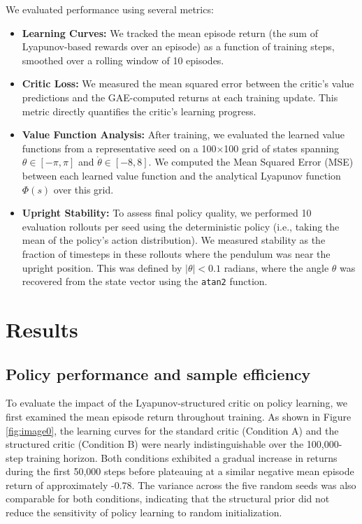 \documentclass[]{article}
\begin{document}
We evaluated performance using several metrics:
\begin{itemize}
    \item \textbf{Learning Curves:} We tracked the mean episode return (the sum of Lyapunov-based rewards over an episode) as a function of training steps, smoothed over a rolling window of 10 episodes.
    \item \textbf{Critic Loss:} We measured the mean squared error between the critic's value predictions and the GAE-computed returns at each training update. This metric directly quantifies the critic's learning progress.
    \item \textbf{Value Function Analysis:} After training, we evaluated the learned value functions from a representative seed on a 100$\times$100 grid of states spanning $\theta \in [-\pi, \pi]$ and $\dot\theta \in [-8, 8]$. We computed the Mean Squared Error (MSE) between each learned value function and the analytical Lyapunov function $\Phi(s)$ over this grid.
    \item \textbf{Upright Stability:} To assess final policy quality, we performed 10 evaluation rollouts per seed using the deterministic policy (i.e., taking the mean of the policy's action distribution). We measured stability as the fraction of timesteps in these rollouts where the pendulum was near the upright position. This was defined by $|\theta| < 0.1$ radians, where the angle $\theta$ was recovered from the state vector using the \texttt{atan2} function.
\end{itemize}

\section{Results}
\label{sec:results}
\subsection{Policy performance and sample efficiency}
To evaluate the impact of the Lyapunov-structured critic on policy learning, we first examined the mean episode return throughout training. As shown in Figure \ref{fig:image0}, the learning curves for the standard critic (Condition A) and the structured critic (Condition B) were nearly indistinguishable over the 100,000-step training horizon. Both conditions exhibited a gradual increase in returns during the first 50,000 steps before plateauing at a similar negative mean episode return of approximately -0.78. The variance across the five random seeds was also comparable for both conditions, indicating that the structural prior did not reduce the sensitivity of policy learning to random initialization.
\end{document}
